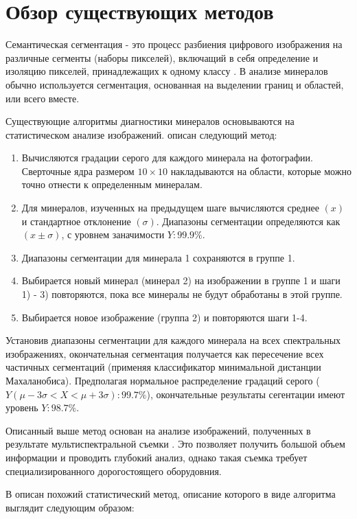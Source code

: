 \section{Обзор существующих методов}
Семантическая сегментация - это процесс разбиения цифрового изображения на различные сегменты (наборы пикселей), включащий в себя
определение и изоляцию пикселей, принадлежащих к одному классу \cite{martinez2007petrographic}.
В анализе минералов обычно используется сегментация, основанная на выделении границ и областей, или всего вместе. \par
Существующие алгоритмы диагностики минералов основываются на статистическом анализе изображений.
 \cite{berrezueta2016ore} описан следующий метод:
\begin{enumerate}[nosep]
    \item Вычисляются градации серого для каждого минерала на фотографии. Сверточные ядра размером $10\times 10$ накладываются на области, которые можно точно отнести к определенным минералам.
    \item Для минералов, изученных на предыдущем шаге вычисляются среднее $(x)$ и стандартное отклонение $(\sigma)$. Диапазоны сегментации определяются как $(x \pm \sigma)$, с уровнем заначимости $Y: 99.9\%$.
    \item Диапазоны сегментации для минерала 1 сохраняются в группе 1.
    \item Выбирается новый минерал (минерал 2) на изображении в группе 1 и шаги 1) - 3) повторяются, пока все минералы не будут обработаны в этой группе.
    \item Выбирается новое изображение (группа 2) и повторяются шаги 1-4.
\end{enumerate}
\par Установив диапазоны сегментации для каждого минерала на всех спектральных изображениях, окончательная сегментация получается как пересечение всех частичных сегментаций (применяя классификатор минимальной дистанции Махаланобиса). Предполагая нормальное распределение градаций серого ($Y(\mu -3\sigma < X < \mu +3\sigma):99.7\%$), окончательные результаты сегентации имеют уровень $Y: 98.7\%$.
\par Описанный выше метод основан на анализе изображений, полученных в результате мультиспектральной съемки \cite{catalina2009use, barnuevo2008ensayo}. Это позволяет получить большой объем информации и проводить глубокий анализ, однако такая съемка требует специализированного дорогостоящего оборудовния.
\par В \cite{kose2012statistical} описан похожий статистический метод, описание которого в виде алгоритма выглядит следующим образом:
